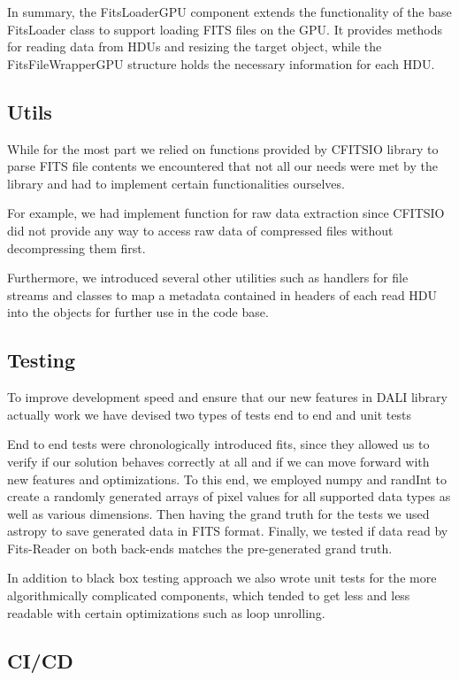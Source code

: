 \documentclass[licencjacka,en]{pracamgr}
\begin{document}
In summary, the FitsLoaderGPU component extends the functionality of the base FitsLoader class to support loading FITS files on the GPU. It provides methods for reading data from HDUs and resizing the target object, while the FitsFileWrapperGPU structure holds the necessary information for each HDU.

\subsection{Utils}

While for the most part we relied on functions provided by CFITSIO library to
parse FITS file contents we encountered that not all our needs were met by
the library and had to implement certain functionalities ourselves. 

For example, we had implement function for raw data extraction since 
CFITSIO did not provide any way to access raw data of compressed files without decompressing them first. 

Furthermore, we introduced several other utilities such as handlers for file streams and classes to map a metadata contained in headers of each read HDU into the objects for further use in the code base. 





\subsection{Testing}
To improve development speed and ensure that our new features in DALI library actually work we have devised two types of tests end to end and unit tests

End to end tests were chronologically introduced fits, since they allowed us to verify if our solution behaves correctly at all and if we can move forward with new features and optimizations. To this end, we employed numpy and randInt to create a randomly generated arrays of pixel values for all supported data types as well as various dimensions. Then having the grand truth for the tests we used astropy to save generated data in FITS format. Finally, we tested if data read by Fits-Reader on both back-ends matches the pre-generated grand truth. 

In addition to black box testing approach we also wrote unit tests for the more algorithmically complicated components, which tended to get less and 
less readable with certain optimizations such as loop unrolling. 

\subsection{CI/CD}
\end{document}
